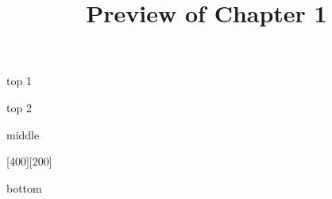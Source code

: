 \documentclass{ximera}
\title{Preview of Chapter 1}
\begin{document}
\begin{abstract}
\end{abstract}

\maketitle



top 1


top 2

\begin{expandable}

\begin{center}
\end{center}

\end{expandable}



middle


\begin{expandable}

\begin{center}
  [400][200]%
\end{center}

\end{expandable}





bottom
\end{document}
